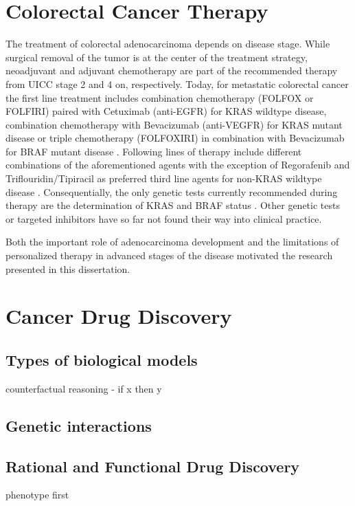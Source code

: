 \begin{flushleft}
\section{Colorectal Cancer Therapy}
The treatment of colorectal adenocarcinoma depends on disease stage. While surgical removal of the tumor is at the center of the treatment strategy, neoadjuvant and adjuvant chemotherapy are part of the recommended therapy from UICC stage 2 and 4 on, respectively. Today, for metastatic colorectal cancer the first line treatment includes combination chemotherapy (FOLFOX or FOLFIRI) paired with Cetuximab (anti-EGFR) for KRAS wildtype disease, combination chemotherapy with Bevacizumab (anti-VEGFR) for KRAS mutant disease or triple chemotherapy (FOLFOXIRI) in combination with Bevacizumab for BRAF mutant disease \cite{Cutsem}. Following lines of therapy include different combinations of the aforementioned agents with the exception of Regorafenib and Triflouridin/Tipiracil as preferred third line agents for non-KRAS wildtype disease \cite{Cutsem}. Consequentially, the only genetic tests currently recommended during therapy are the determination of KRAS and BRAF status \cite{Cutsem}. Other genetic tests or targeted inhibitors have so far not found their way into clinical practice.\par

Both the important role of adenocarcinoma development and the limitations of personalized therapy in advanced stages of the disease motivated the research presented in this dissertation.

\section{Cancer Drug Discovery}
\subsection{Types of biological models}
counterfactual reasoning - if x then y

\subsection{Genetic interactions}

\subsection{Rational and Functional Drug Discovery}
phenotype first


\end{flushleft}
